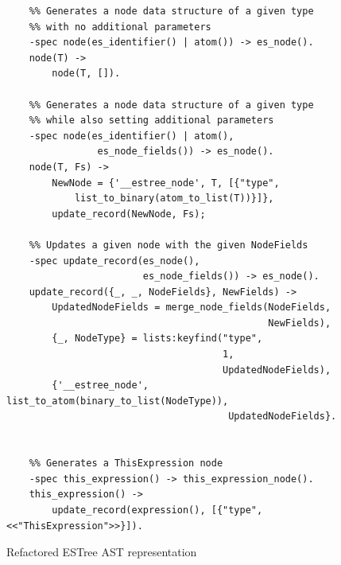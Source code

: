 \documentclass[twoside,12pt,titlepage,a4paper]{article}
\begin{document}
\begin{figure}[th]
	\centering
	\begin{verbatim}
	%% Generates a node data structure of a given type 
	%% with no additional parameters
	-spec node(es_identifier() | atom()) -> es_node().
	node(T) ->
		node(T, []).
	
	%% Generates a node data structure of a given type 
	%% while also setting additional parameters
	-spec node(es_identifier() | atom(),
				es_node_fields()) -> es_node().
	node(T, Fs) ->
		NewNode = {'__estree_node', T, [{"type", 
		    list_to_binary(atom_to_list(T))}]},
		update_record(NewNode, Fs);

	%% Updates a given node with the given NodeFields
	-spec update_record(es_node(),
	                    es_node_fields()) -> es_node().
	update_record({_, _, NodeFields}, NewFields) ->
		UpdatedNodeFields = merge_node_fields(NodeFields, 
		                                      NewFields),
		{_, NodeType} = lists:keyfind("type", 
	                                  1,
	                                  UpdatedNodeFields),
		{'__estree_node', list_to_atom(binary_to_list(NodeType)), 
		                               UpdatedNodeFields}.


	%% Generates a ThisExpression node
	-spec this_expression() -> this_expression_node().
	this_expression() ->
		update_record(expression(), [{"type", <<"ThisExpression">>}]).
	\end{verbatim}
	\caption{Refactored ESTree AST representation}
	\label{fig:estree_old:erl}
\end{figure}



\vskip 0.2in
%


\end{document}
